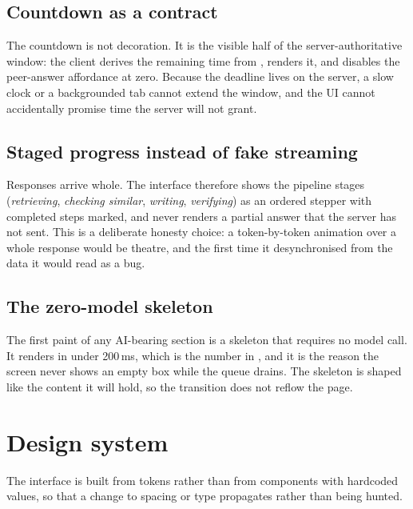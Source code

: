 \subsection{Countdown as a contract}

The countdown is not decoration. It is the visible half of the server-authoritative window:
the client derives the remaining time from , renders it, and disables the
peer-answer affordance at zero. Because the deadline lives on the server, a slow clock or a
backgrounded tab cannot extend the window, and the UI cannot accidentally promise time the
server will not grant.

\subsection{Staged progress instead of fake streaming}

Responses arrive whole. The interface therefore shows the pipeline stages
(\emph{retrieving}, \emph{checking similar}, \emph{writing}, \emph{verifying}) as an ordered
stepper with completed steps marked, and never renders a partial answer that the server has
not sent. This is a deliberate honesty choice: a token-by-token animation over a whole
response would be theatre, and the first time it desynchronised from the data it would read
as a bug.

\subsection{The zero-model skeleton}

The first paint of any AI-bearing section is a skeleton that requires no model call. It
renders in under 200\,ms, which is the number in , and it is the
reason the screen never shows an empty box while the queue drains. The skeleton is shaped
like the content it will hold, so the transition does not reflow the page.

\section{Design system}

The interface is built from tokens rather than from components with hardcoded values, so
that a change to spacing or type propagates rather than being hunted.

